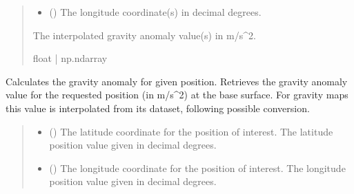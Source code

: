 \documentclass[letterpaper,10pt,english]{sphinxmanual}
\begin{document}
\begin{fulllineitems}
\begin{fulllineitems}
\begin{quote}
\begin{description}
\begin{itemize}
\item {} 
\sphinxAtStartPar
{} (\sphinxstyleliteralemphasis{\sphinxupquote{ | }}) \textendash{} The longitude coordinate(s) in decimal degrees.

\end{itemize}

\sphinxAtStartPar
The interpolated gravity anomaly value(s) in m/s\textasciicircum{}2.

\sphinxAtStartPar
float | np.ndarray

\end{description}\end{quote}

\end{fulllineitems}


\begin{fulllineitems}
\label{\detokenize{modules/gravity/geosat:qnav.gravity.geosat.Geosat44.get_anomaly}}
\pysigstartsignatures
{}
\pysigstopsignatures
\sphinxAtStartPar
Calculates the gravity anomaly for given position.
Retrieves the gravity anomaly value for the requested position
(in m/s\textasciicircum{}2) at the base surface. For gravity maps this value is
interpolated from its dataset, following possible conversion.
\begin{quote}\begin{description}
\begin{itemize}
\item {} 
\sphinxAtStartPar
{} () \textendash{} The latitude coordinate for the position of interest.
The latitude position value given in decimal degrees.

\item {} 
\sphinxAtStartPar
{} () \textendash{} The longitude coordinate for the position of interest.
The longitude position value given in decimal degrees.


\end{itemize}
\end{description}
\end{quote}
\end{fulllineitems}
\end{fulllineitems}
\end{document}
